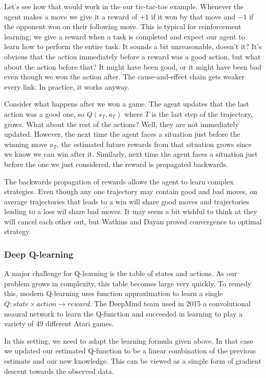 \documentclass{article}
\theoremstyle{changedot}
\theoremstyle{changedotbreak}
\theoremstyle{nonumberplain}
\begin{document}
Let's see how that would work in the our tic-tac-toe example. Whenever the agent makes a move we give it a reward of $+1$ if it won by that move and $-1$ if the opponent won on their following move. This is typical for reinforcement learning; we give a reward when a task is completed and expect our agent to learn how to perform the entire task. It sounds a bit unreasonable, doesn't it? It's obvious that the action immediately before a reward was a good action, but what about the action before that? It might have been good, or it might have been bad even though we won the action after. The cause-and-effect chain gets weaker every link. In practice, it works anyway.

Consider what happens after we won a game. The agent updates that the last action was a good one, so $Q(s_{T}, a_{T})$ where $T$ is the last step of the trajectory, grows. What about the rest of the actions? Well, they are not immediately updated. However, the next time the agent faces a situation just before the winning move $a_{T}$, the estimated future rewards from that situation grows since we know we can win after it. Similarly, next time the agent faces a situation just before the one we just considered, the reward is propagated backwards.

The backwards propagation of rewards allows the agent to learn complex strategies. Even though any one trajectory may contain good and bad moves, on average trajectories that leads to a win will share good moves and trajectories leading to a loss wil share bad moves. It may seem a bit wishful to think at they will cancel each other out, but Watkins and Dayan proved convergence to optimal strategy.

\subsubsection{Deep Q-learning}
A major challenge for Q-learning is the table of states and actions. As our problem grows in complexity, this table becomes large very quickly. To remedy this, modern Q-learning uses function approximation to learn a single $Q : state \times action \to reward$. The DeepMind team used in 2015 a convolutional neaural network to learn the Q-function and succeeded in learning to play a variety of 49 different Atari games.

In this setting, we need to adapt the learning formula given above. In that case we updated our estimated Q-function to be a linear combination of the previous estimate and our new knowledge. This can be viewed as a simple form of gradient descent towards the observed data.
\end{document}
